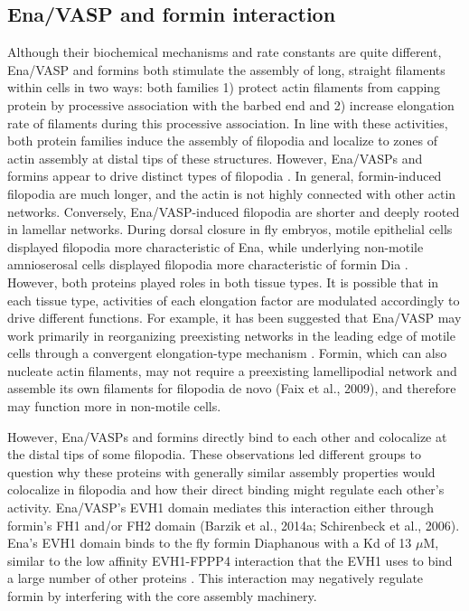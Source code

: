 \subsection{Ena/VASP and formin interaction}\label{ena-formin-interaction}

Although their biochemical mechanisms and rate constants are quite different, Ena/VASP and formins both stimulate the assembly of long, straight filaments within cells in two ways: both families 1) protect actin filaments from capping protein by processive association with the barbed end and 2) increase elongation rate of filaments during this processive association. In line with these activities, both protein families induce the assembly of filopodia \citep{bilancia_enabled_2014,homem_exploring_2009} and localize to zones of actin assembly at distal tips of these structures. However, Ena/VASPs and formins appear to drive distinct types of filopodia \citep{barzik_ena/vasp_2014,bilancia_enabled_2014,nowotarski_actin_2014,homem_exploring_2009}. In general, formin-induced filopodia are much longer, and the actin is not highly connected with other actin networks. Conversely, Ena/VASP-induced filopodia are shorter and deeply rooted in lamellar networks. During dorsal closure in fly embryos, motile epithelial cells displayed filopodia more characteristic of Ena, while underlying non-motile amnioserosal cells displayed filopodia more characteristic of formin Dia \citep{nowotarski_actin_2014}. However, both proteins played roles in both tissue types. It is possible that in each tissue type, activities of each elongation factor are modulated accordingly to drive different functions. For example, it has been suggested that Ena/VASP may work primarily in reorganizing preexisting networks in the leading edge of motile cells through a convergent elongation-type mechanism \citep{svitkina_mechanism_2003}. Formin, which can also nucleate actin filaments, may not require a preexisting lamellipodial network and assemble its own filaments for filopodia de novo (Faix et al., 2009), and therefore may function more in non-motile cells. 

However, Ena/VASPs and formins directly bind to each other and colocalize at the distal tips of some filopodia. These observations led different groups to question why these proteins with generally similar assembly properties would colocalize in filopodia and how their direct binding might regulate each other's activity. Ena/VASP's EVH1 domain mediates this interaction either through formin's FH1 \citep{bilancia_enabled_2014} and/or FH2 domain (Barzik et al., 2014a; Schirenbeck et al., 2006). Ena's EVH1 domain binds to the fly formin Diaphanous with a Kd of 13 $\mu$M, similar to the low affinity EVH1-FPPP4 interaction that the EVH1 uses to bind a large number of other proteins \citep{prehoda_structure_1999}. This interaction may negatively regulate formin by interfering with the core assembly machinery. 

